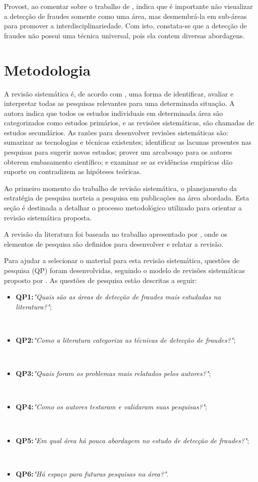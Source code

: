 \documentclass[smallextended]{svjour3}
\begin{document}
Provost, ao comentar sobre o trabalho de \cite{Bolton2002}, indica que é importante não visualizar a detecção de fraudes somente como uma área, mas desmembrá-la em sub-áreas para promover a interdisciplinariedade. Com isto, constata-se que a detecção de fraudes não possui uma técnica universal, pois ela contem diversas abordagens. 

\section{Metodologia}
\label{sec:3}

A revisão sistemática é, de acordo com \cite{Kitchenham2004}, uma forma de identificar, avaliar e interpretar todas as pesquisas relevantes para uma determinada situação. A autora indica que todos os estudos individuais em determinada área são categorizados como estudos primários, e as revisões sistemáticas, são chamadas de estudos secundários. As razões para desenvolver revisões sistemáticas são: sumarizar as tecnologias e técnicas existentes; identificar as lacunas presentes nas pesquisas para sugerir novos estudos; prover um arcabouço para os autores obterem embasamento científico; e examinar se as evidências empíricas dão suporte ou contradizem as hipóteses teóricas. 

Ao primeiro momento do trabalho de revisão sistemática, o planejamento da estratégia de pesquisa norteia a pesquisa em publicações na área abordada. Esta seção é destinada a detalhar o processo metodológico utilizado para orientar a revisão sistemática proposta.

A revisão da literatura foi baseada no trabalho apresentado por \cite{Kitchenham07guidelinesfor}, onde os elementos de pesquisa são definidos para desenvolver e relatar a revisão.

Para ajudar a selecionar o material para esta revisão sistemática, questões de pesquisa (QP) foram desenvolvidas, seguindo o modelo de revisões sistemáticas proposto por \cite{Kitchenham07guidelinesfor}. As questões de pesquisa estão descritas a seguir:

\begin{itemize}
	\item \textbf{QP1:}\textit{"Quais são as áreas de detecção de fraudes mais estudadas na literatura?"};
	 
	\
	\item \textbf{QP2:}\textit{"Como a literatura categoriza as técnicas de detecção de fraudes?"};
	
	\
	\item \textbf{QP3:}\textit{"Quais foram os problemas mais relatados pelos autores?"};
	
	\
	\item \textbf{QP4:}\textit{"Como os autores testaram e validaram suas pesquisas?"};
	
	\
	\item \textbf{QP5:}\textit{"Em qual área há pouca abordagem no estudo de detecção de fraudes?"};
	
	\
	\item \textbf{QP6:}\textit{"Há espaço para futuras pesquisas na área?"}.
		
\end{itemize}
\end{document}
